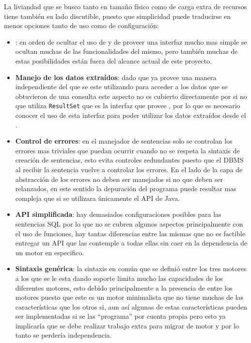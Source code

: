 La liviandad que se busco tanto en tamaño físico como de carga extra de recursos tiene también su lado discutible, puesto que simplicidad puede traducirse en menos opciones tanto de uso como de configuración:
%
\begin{itemize}
\item \textbf{\jd}: en orden de ocultar el uso de \jd y de proveer una interfaz mucho mas simple se ocultan muchas de las funcionalidades del mismo, pero también muchas de estas posibilidades están fuera del alcance actual de este proyecto.
%
\item \textbf{Manejo de los datos extraídos}: dado que \jd ya provee una manera independiente del \dd que se este utilizando para acceder a los datos que se obtuvieron de una consulta este aspecto no es cubierto directamente por \jj si no que utiliza \verb=ResultSet= que es la interfaz que provee \jj, por lo que es necesario conocer el uso de esta interfaz para poder utilizar los datos extraídos desde el \dd.
%
\item \textbf{Control de errores}: en el manejador de sentencias solo se controlan los errores mas triviales que puedan ocurrir cuando no se respeta la sintaxis de creación de sentencias, esto evita controles redundantes puesto que el DBMS al recibir la sentencia vuelve a controlar los errores. En el lado de la capa de abstracción de \jd los errores no deben ser manejados si no que deben ser relanzados, en este sentido la depuración del programa puede resultar mas compleja que si se utilizara únicamente el API de Java.
%
\item \textbf{API simplificada}: hay demasiados configuraciones posibles para las sentencias SQL por lo que no se cubren algunos aspectos principalmente con el uso de funciones, hay tantas diferencias entre las mismas que no es factible entregar un API que las contemple a todas ellas sin caer en la dependencia de un motor en especifico.
%
\item \textbf{Sintaxis genérica}: la sintaxis en común que se definió entre los tres motores a los que se le esta dando soporte limita mucho las capacidades de los diferentes motores, esto debido principalmente a la presencia de \s entre los motores puesto que este es un motor minimalista que no tiene muchas de las características que los otros si, aun así algunas de estas características pueden ser implementadas si se las ``programa'' por cuenta propia pero esto ya implicaría que se debe realizar trabajo extra para migrar de motor y por lo tanto se perdería independencia. 
\end{itemize}
%
%
%
